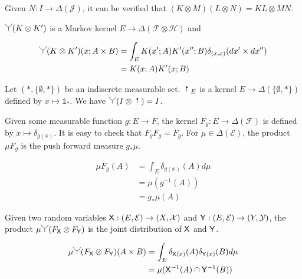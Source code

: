 Given $N:I\to \Delta(\mathcal{J})$, it can be verified that $(K\otimes M)(L\otimes N)=KL\otimes MN$.

$\splitter{0.15}(K\otimes K')$ is a Markov kernel $E\to \Delta(\mathcal{F}\otimes\mathcal{H})$ and

\begin{align}
    \splitter{0.15}(K\otimes K')(x;A\times B) &= \int_E K(x';A)K'(x'';B) \delta_{(x,x)} (dx'\times dx'')\\
                                              &= K(x;A)K'(x;B) \label{eq:outer_product}
\end{align}


Let $(*,\{\emptyset,*\})$ be an indiscrete measurable set. $\stopper{0.15}_E$ is a kernel $E\to \Delta(\{\emptyset,*\})$ defined by $x\mapsto \mathds{1}_*$. We have $\splitter{0.15}(I\otimes \stopper{0.15}) = I$.

Given some measurable function $g:E\to F$, the kernel $F_g:E\to \Delta(\mathcal{F})$ is defined by $x\mapsto \delta_{g(x)}$. It is easy to check that $F_g F_g = F_g$. For $\mu\in \Delta(\mathcal{E})$, the product $\mu F_g$ is the push forward measure $g_*\mu$.


\begin{align}
    \mu F_g (A) &= \int_E \delta_{g(x)}(A) d\mu\\
                &= \mu(g^{-1}(A))\\
                &= g_*\mu(A)
\end{align}

Given two random variables $\mathsf{X}:(E,\mathcal{E})\to (X,\mathcal{X})$ and $\mathsf{Y}:(E,\mathcal{E})\to (Y,\mathcal{Y})$, the product $\mu\splitter{0.15}(F_{\RV{X}}\otimes F_{\RV{Y}})$ is the joint distribution of $\mathsf{X}$ and $\mathsf{Y}$.

\begin{align}
    \mu \splitter{0.15}(F_{\RV{X}}\otimes F_{\RV{Y}}) (A\times B) &= \int_E \delta_{\RV{X}(x)}(A) \delta_{\RV{Y}(x)}(B) d\mu \\
                        &= \mu(\RV{X}^{-1}(A)\cap \RV{Y}^{-1}(B))
\end{align}

